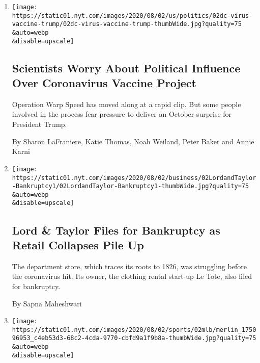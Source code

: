 \begin{enumerate}
\def\labelenumi{\arabic{enumi}.}
\item
  \href{/2020/08/02/us/politics/coronavirus-vaccine.html}{}

  \texttt{[image: https://static01.nyt.com/images/2020/08/02/us/politics/02dc-virus-vaccine-trump/02dc-virus-vaccine-trump-thumbWide.jpg?quality=75\\\&auto=webp\\\&disable=upscale]}

  \hypertarget{scientists-worry-about-political-influence-over-coronavirus-vaccine-project}{%
  \subsection{Scientists Worry About Political Influence Over
  Coronavirus Vaccine
  Project}\label{scientists-worry-about-political-influence-over-coronavirus-vaccine-project}}

  Operation Warp Speed has moved along at a rapid clip. But some people
  involved in the process fear pressure to deliver an October surprise
  for President Trump.

  By Sharon LaFraniere, Katie Thomas, Noah Weiland, Peter Baker and
  Annie Karni
\item
  \href{/2020/08/02/business/Lord-and-Taylor-Bankruptcy.html}{}

  \texttt{[image: https://static01.nyt.com/images/2020/08/02/business/02LordandTaylor-Bankruptcy1/02LordandTaylor-Bankruptcy1-thumbWide.jpg?quality=75\\\&auto=webp\\\&disable=upscale]}

  \hypertarget{lord--taylor-files-for-bankruptcy-as-retail-collapses-pile-up}{%
  \subsection{Lord \& Taylor Files for Bankruptcy as Retail Collapses
  Pile
  Up}\label{lord--taylor-files-for-bankruptcy-as-retail-collapses-pile-up}}

  The department store, which traces its roots to 1826, was struggling
  before the coronavirus hit. Its owner, the clothing rental start-up Le
  Tote, also filed for bankruptcy.

  By Sapna Maheshwari
\item
  \href{/2020/08/02/sports/baseball/mlb-coronavirus-outbreaks.html}{}

  \texttt{[image: https://static01.nyt.com/images/2020/08/02/sports/02mlb/merlin\_175096953\_c4eb53d3-68c2-4cda-9770-cbfd9a1f9b8a-thumbWide.jpg?quality=75\\\&auto=webp\\\&disable=upscale]}


\end{enumerate}
